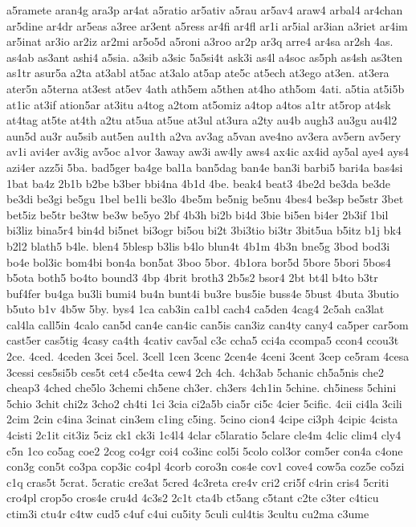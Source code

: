 {a5ramete
aran4g
ara3p
ar4at
a5ratio
ar5ativ
a5rau
ar5av4
araw4
arbal4
ar4chan
ar5dine
ar4dr
ar5eas
a3ree
ar3ent
a5ress
ar4fi
ar4fl
ar1i
ar5ial
ar3ian
a3riet
ar4im
ar5inat
ar3io
ar2iz
ar2mi
ar5o5d
a5roni
a3roo
ar2p
ar3q
arre4
ar4sa
ar2sh
4as.
as4ab
as3ant
ashi4
a5sia.
a3sib
a3sic
5a5si4t
ask3i
as4l
a4soc
as5ph
as4sh
as3ten
as1tr
asur5a
a2ta
at3abl
at5ac
at3alo
at5ap
ate5c
at5ech
at3ego
at3en.
at3era
ater5n
a5terna
at3est
at5ev
4ath
ath5em
a5then
at4ho
ath5om
4ati.
a5tia
at5i5b
at1ic
at3if
ation5ar
at3itu
a4tog
a2tom
at5omiz
a4top
a4tos
a1tr
at5rop
at4sk
at4tag
at5te
at4th
a2tu
at5ua
at5ue
at3ul
at3ura
a2ty
au4b
augh3
au3gu
au4l2
aun5d
au3r
au5sib
aut5en
au1th
a2va
av3ag
a5van
ave4no
av3era
av5ern
av5ery
av1i
avi4er
av3ig
av5oc
a1vor
3away
aw3i
aw4ly
aws4
ax4ic
ax4id
ay5al
aye4
ays4
azi4er
azz5i
5ba.
bad5ger
ba4ge
bal1a
ban5dag
ban4e
ban3i
barbi5
bari4a
bas4si
1bat
ba4z
2b1b
b2be
b3ber
bbi4na
4b1d
4be.
beak4
beat3
4be2d
be3da
be3de
be3di
be3gi
be5gu
1bel
be1li
be3lo
4be5m
be5nig
be5nu
4bes4
be3sp
be5str
3bet
bet5iz
be5tr
be3tw
be3w
be5yo
2bf
4b3h
bi2b
bi4d
3bie
bi5en
bi4er
2b3if
1bil
bi3liz
bina5r4
bin4d
bi5net
bi3ogr
bi5ou
bi2t
3bi3tio
bi3tr
3bit5ua
b5itz
b1j
bk4
b2l2
blath5
b4le.
blen4
5blesp
b3lis
b4lo
blun4t
4b1m
4b3n
bne5g
3bod
bod3i
bo4e
bol3ic
bom4bi
bon4a
bon5at
3boo
5bor.
4b1ora
bor5d
5bore
5bori
5bos4
b5ota
both5
bo4to
bound3
4bp
4brit
broth3
2b5s2
bsor4
2bt
bt4l
b4to
b3tr
buf4fer
bu4ga
bu3li
bumi4
bu4n
bunt4i
bu3re
bus5ie
buss4e
5bust
4buta
3butio
b5uto
b1v
4b5w
5by.
bys4
1ca
cab3in
ca1bl
cach4
ca5den
4cag4
2c5ah
ca3lat
cal4la
call5in
4calo
can5d
can4e
can4ic
can5is
can3iz
can4ty
cany4
ca5per
car5om
cast5er
cas5tig
4casy
ca4th
4cativ
cav5al
c3c
ccha5
cci4a
ccompa5
ccon4
ccou3t
2ce.
4ced.
4ceden
3cei
5cel.
3cell
1cen
3cenc
2cen4e
4ceni
3cent
3cep
ce5ram
4cesa
3cessi
ces5si5b
ces5t
cet4
c5e4ta
cew4
2ch
4ch.
4ch3ab
5chanic
ch5a5nis
che2
cheap3
4ched
che5lo
3chemi
ch5ene
ch3er.
ch3ers
4ch1in
5chine.
ch5iness
5chini
5chio
3chit
chi2z
3cho2
ch4ti
1ci
3cia
ci2a5b
cia5r
ci5c
4cier
5cific.
4cii
ci4la
3cili
2cim
2cin
c4ina
3cinat
cin3em
c1ing
c5ing.
5cino
cion4
4cipe
ci3ph
4cipic
4cista
4cisti
2c1it
cit3iz
5ciz
ck1
ck3i
1c4l4
4clar
c5laratio
5clare
cle4m
4clic
clim4
cly4
c5n
1co
co5ag
coe2
2cog
co4gr
coi4
co3inc
col5i
5colo
col3or
com5er
con4a
c4one
con3g
con5t
co3pa
cop3ic
co4pl
4corb
coro3n
cos4e
cov1
cove4
cow5a
coz5e
co5zi
c1q
cras5t
5crat.
5cratic
cre3at
5cred
4c3reta
cre4v
cri2
cri5f
c4rin
cris4
5criti
cro4pl
crop5o
cros4e
cru4d
4c3s2
2c1t
cta4b
ct5ang
c5tant
c2te
c3ter
c4ticu
ctim3i
ctu4r
c4tw
cud5
c4uf
c4ui
cu5ity
5culi
cul4tis
3cultu
cu2ma
c3ume
}
